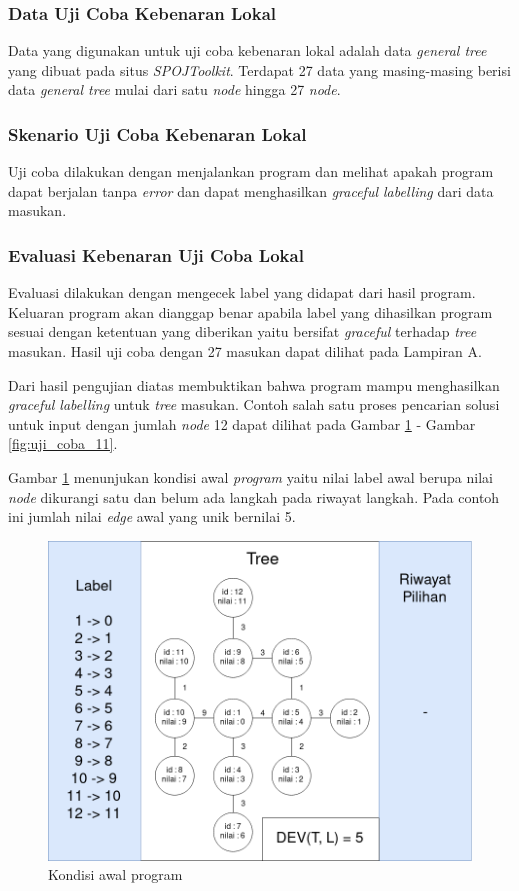 \subsubsection{Data Uji Coba Kebenaran Lokal}
Data yang digunakan untuk uji coba kebenaran lokal adalah data \textit{general tree} yang dibuat pada situs \textit{SPOJToolkit}\cite{SPOJTOOLKIT}. Terdapat 27 data yang masing-masing berisi data \textit{general tree} mulai dari satu \textit{node} hingga 27 \textit{node}.

\subsubsection{Skenario Uji Coba Kebenaran Lokal}
Uji coba dilakukan dengan menjalankan program dan melihat apakah program dapat berjalan tanpa \textit{error} dan dapat menghasilkan \textit{graceful labelling} dari data masukan.

\subsubsection{Evaluasi Kebenaran Uji Coba Lokal}
Evaluasi dilakukan dengan mengecek label yang didapat dari hasil program. Keluaran program akan dianggap benar apabila label yang dihasilkan program sesuai dengan ketentuan yang diberikan yaitu bersifat \textit{graceful} terhadap \textit{tree} masukan. Hasil uji coba dengan 27 masukan dapat dilihat pada Lampiran A.

Dari hasil pengujian diatas membuktikan bahwa program mampu menghasilkan \textit{graceful labelling} untuk \textit{tree} masukan. Contoh salah satu proses pencarian solusi untuk input dengan jumlah \textit{node} 12 dapat dilihat pada Gambar \ref{fig:uji_coba_1} - Gambar \ref{fig:uji_coba_11}.
\par Gambar \ref{fig:uji_coba_1} menunjukan kondisi awal \textit{program} yaitu nilai label awal berupa nilai \textit{node} dikurangi satu dan belum ada langkah pada riwayat langkah. Pada contoh ini jumlah nilai \textit{edge} awal yang unik bernilai 5.

\begin{figure}[ht]
	\centering\includegraphics[width=1\textwidth]{bab5/figures/uji_coba_1.png}
	\caption{Kondisi awal program}
	\label{fig:uji_coba_1}
\end{figure}

